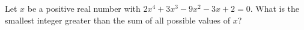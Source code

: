 Let $x$ be a positive real number with $2x^4+3x^3-9x^2-3x+2=0$. What is the smallest integer greater than the sum of all possible values of $x$?
